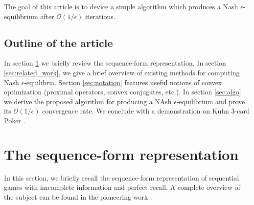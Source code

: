 \documentclass{article} %
\begin{document}
The goal of this article is to device a simple algorithm which produces a Nash $\epsilon$-equilibrium after $\mathcal{O}(1/\epsilon)$ iterations.

\subsection{Outline of the article}
In section \ref{sec:rep} we briefly review the sequence-form representation. In section \ref{sec:related_work}, we give a brief overview of existing methods for computing Nash $\epsilon$-equilibria. Section \ref{sec:notation} features useful notions of convex optimization (proximal operators, convex conjugates, etc.). In section \ref{sec:algo} we derive the proposed algorithm for producing a NAsh $\epsilon$-equilibrium and prove its $\mathcal{O}(1/\epsilon)$ convergence rate. We conclude with a demonstration on Kuhn 3-card Poker \cite{kuhn}.



\section{The sequence-form representation}
\label{sec:rep}
In this section, we briefly recall the sequence-form representation of sequential games with imcomplete information and perfect recall. A complete overview of the subject can be found in the pioneering work \cite{von1996efficient}.
\end{document}
